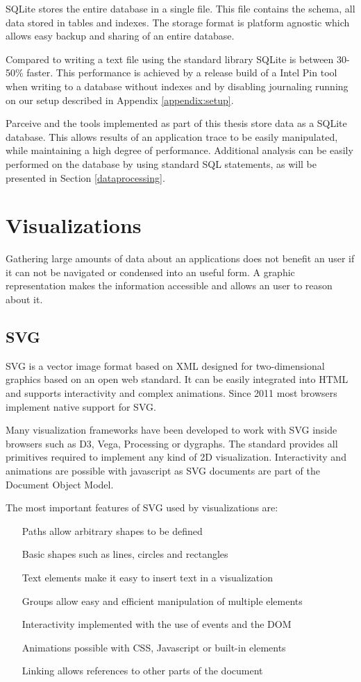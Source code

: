 SQLite stores the entire database in a single file. This file contains the schema, all data stored in tables and indexes. The storage format is platform agnostic which allows easy backup and sharing of an entire database.

Compared to writing a text file using the standard library SQLite is between 30-50\% faster. This performance is achieved by a release build of a Intel Pin tool when writing to a database without indexes and by disabling journaling running on our setup described in Appendix \ref{appendix:setup}.

Parceive and the tools implemented as part of this thesis store data as a SQLite database. This allows results of an application trace to be easily manipulated, while maintaining a high degree of performance. Additional analysis can be easily performed on the database by using standard SQL statements, as will be presented in Section \ref{dataprocessing}.

\section {Visualizations}

Gathering large amounts of data about an applications does not benefit an user if it can not be navigated or condensed into an useful form. A graphic representation makes the information accessible and allows an user to reason about it.

\subsection {SVG}

SVG \cite{svg11} is a vector image format based on XML designed for two-dimensional graphics based on an open web standard. It can be easily integrated into HTML and supports interactivity and complex animations. Since 2011 most browsers implement native support for SVG.

Many visualization frameworks have been developed to work with SVG inside browsers such as D3, Vega, Processing or dygraphs. The standard provides all primitives required to implement any kind of 2D visualization. Interactivity and animations are possible with javascript as SVG documents are part of the Document Object Model.

The most important features of SVG used by visualizations are:

\begin{itemize}
	\item[Paths] allow arbitrary shapes to be defined
	\item[Basic shapes] such as lines, circles and rectangles
	\item[Text elements] make it easy to insert text in a visualization
	\item[Groups] allow easy and efficient manipulation of multiple elements
	\item[Interactivity] implemented with the use of events and the DOM
	\item[Animations] possible with CSS, Javascript or built-in elements
	\item[Linking] allows references to other parts of the document
\end{itemize}

